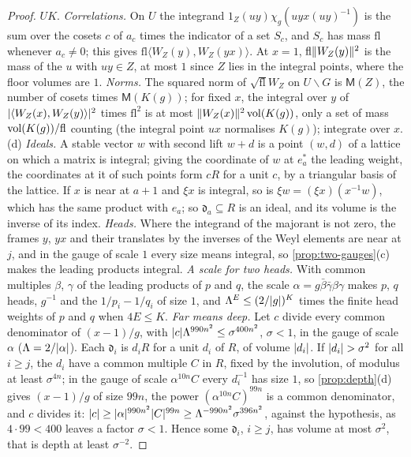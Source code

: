 \begin{proof}
$UK$. \emph{Correlations.} On $U$ the integrand $1_Z(uy)\chi_g(uyx(uy)^{-1})$ is the sum over the cosets $c$ of $a_c$ times the indicator of a set $S_c$, and $S_c$ has mass $\mathrm{fl}$ whenever $a_c\ne0$; this gives $\mathrm{fl}\langle W_Z(y),W_Z(yx)\rangle$. At $x=1$,
$\mathrm{fl}\lVert W_Z(y)\rVert^2$ is the mass of the $u$ with $uy\in Z$, at most $1$ since $Z$ lies in the integral points, where the floor volumes are $1$. \emph{Norms.} The squared norm of $\sqrt{\mathrm{fl}}W_Z$ on $U\backslash G$ is $\mathsf M(Z)$, the number of cosets
times $\mathsf M(K(g))$; for fixed $x$, the integral over $y$ of $\lvert \langle W_Z(x),W_Z(y)\rangle\rvert^2$ times $\mathrm{fl}^2$ is at most $\lVert W_Z(x)\rVert^2\operatorname{vol}(K(g))$, only a set of mass $\operatorname{vol}(K(g))/\mathrm{fl}$ counting (the integral point $ux$ normalises
$K(g)$); integrate over $x$.
(d) \emph{Ideals.} A stable vector $w$ with second lift $w+d$ is a point $(w,d)$ of a lattice on which a matrix is integral; giving the coordinate of $w$ at $e^*_a$ the leading weight, the coordinates at it of such points form $cR$ for a unit $c$, by a
triangular basis of the lattice. If $x$ is near at $a+1$ and $\xi x$ is integral, so is $\xi w=(\xi x)(x^{-1}w)$, which has the same product with $e_a$; so $\mathfrak d_a\subseteq R$ is an ideal, and its volume is the inverse of its index. \emph{Heads.} Where the
integrand of the majorant is not zero, the frames $y$, $yx$ and their translates by the inverses of the Weyl elements are near at $j$, and in the gauge of scale $1$ every size means integral, so \cref{prop:two-gauges}(c) makes the leading products
integral. \emph{A scale for two heads.} With common multiples $\beta$, $\gamma$ of the leading products of $p$ and $q$, the scale $\alpha=g\bar\beta\bar\gamma\beta\gamma$ makes $p$, $q$ heads, $g^{-1}$ and the $1/p_i-1/q_i$ of size $1$, and $\Lambda^E\le(2/\lvert g\rvert)^K$ times the
finite head weights of $p$ and $q$ when $4E\le K$. \emph{Far means deep.} Let $c$ divide every common denominator of $(x-1)/g$, with $\lvert c\rvert\Lambda^{990n^2}\le\sigma^{400n^2}$, $\sigma<1$, in the gauge of scale $\alpha$ ($\Lambda=2/\lvert \alpha\rvert$). Each $\mathfrak d_i$ is $d_iR$ for a unit $d_i$ of $R$, of volume
$\lvert d_i\rvert$. If $\lvert d_i\rvert>\sigma^2$ for all $i\ge j$, the $d_i$ have a common multiple $C$ in $R$, fixed by the involution, of modulus at least $\sigma^{4n}$; in the gauge of scale $\alpha^{10n}C$ every $d_i^{-1}$ has size $1$, so \cref{prop:depth}(d)
gives $(x-1)/g$ of size $99n$, the power $(\alpha^{10n}C)^{99n}$ is a common denominator, and $c$ divides it: $\lvert c\rvert\ge\lvert \alpha\rvert^{990n^2}\lvert C\rvert^{99n}\ge\Lambda^{-990n^2}\sigma^{396n^2}$, against the hypothesis, as $4\cdot99<400$ leaves a factor $\sigma<1$.
Hence some $\mathfrak d_i$, $i\ge j$, has volume at most $\sigma^2$, that is depth at least $\sigma^{-2}$.
\end{proof}

